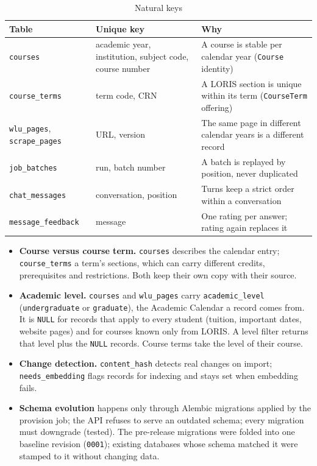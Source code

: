 \documentclass[11pt,letterpaper]{report}
\begin{document}
\begin{table}[H]
\centering
\caption{Natural keys}\label{tab:keys}
\begin{tabularx}{\textwidth}{@{}P{3.6cm}P{5.6cm}L@{}}
\toprule
\textbf{Table} & \textbf{Unique key} & \textbf{Why} \\
\midrule
\texttt{courses} & academic year, institution, subject code, course number & A course is stable per calendar year (\texttt{Course} identity) \\
\texttt{course\_terms} & term code, CRN & A LORIS section is unique within its term (\texttt{CourseTerm} offering) \\
\texttt{wlu\_pages}, \texttt{scrape\_pages} & URL, version & The same page in different calendar years is a different record \\
\texttt{job\_batches} & run, batch number & A batch is replayed by position, never duplicated \\
\texttt{chat\_messages} & conversation, position & Turns keep a strict order within a conversation \\
\texttt{message\_feedback} & message & One rating per answer; rating again replaces it \\
\bottomrule
\end{tabularx}
\end{table}

\begin{itemize}
  \item \textbf{Course versus course term.} \texttt{courses} describes the calendar entry;
        \texttt{course\_terms} a term's sections, which can carry different credits, prerequisites and
        restrictions. Both keep their own copy with their source.
  \item \textbf{Academic level.} \texttt{courses} and \texttt{wlu\_pages} carry
        \texttt{academic\_level} (\texttt{undergraduate} or \texttt{graduate}), the Academic Calendar a
        record comes from. It is \texttt{NULL} for records that apply to every student (tuition,
        important dates, website pages) and for courses known only from LORIS. A level filter returns
        that level plus the \texttt{NULL} records. Course terms take the level of their course.
  \item \textbf{Change detection.} \texttt{content\_hash} detects real changes on import;
        \texttt{needs\_embedding} flags records for indexing and stays set when embedding fails.
  \item \textbf{Schema evolution} happens only through Alembic migrations applied by the provision job;
        the API refuses to serve an outdated schema; every migration must downgrade (tested). The
        pre-release migrations were folded into one baseline revision (\texttt{0001}); existing databases
        whose schema matched it were stamped to it without changing data.
\end{itemize}
\end{document}

